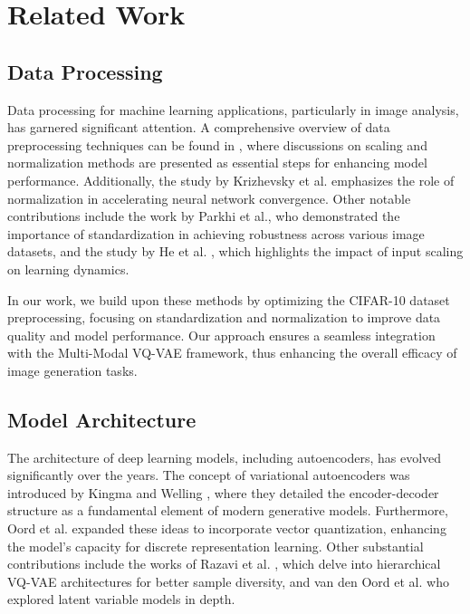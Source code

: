 \section{Related Work}

\subsection{Data Processing}

Data processing for machine learning applications, particularly in image analysis, has garnered significant attention. A comprehensive overview of data preprocessing techniques can be found in \cite{agarwal2019data}, where discussions on scaling and normalization methods are presented as essential steps for enhancing model performance. Additionally, the study by Krizhevsky et al. \cite{krizhevsky2012imagenet} emphasizes the role of normalization in accelerating neural network convergence. Other notable contributions include the work by Parkhi et al., who demonstrated the importance of standardization in achieving robustness across various image datasets, and the study by He et al. \cite{he2016deep}, which highlights the impact of input scaling on learning dynamics.

In our work, we build upon these methods by optimizing the CIFAR-10 dataset preprocessing, focusing on standardization and normalization to improve data quality and model performance. Our approach ensures a seamless integration with the Multi-Modal VQ-VAE framework, thus enhancing the overall efficacy of image generation tasks.

\subsection{Model Architecture}

The architecture of deep learning models, including autoencoders, has evolved significantly over the years. The concept of variational autoencoders was introduced by Kingma and Welling \cite{kingma2013auto}, where they detailed the encoder-decoder structure as a fundamental element of modern generative models. Furthermore, Oord et al. expanded these ideas to incorporate vector quantization, enhancing the model’s capacity for discrete representation learning. Other substantial contributions include the works of Razavi et al. \cite{razavi2019generating}, which delve into hierarchical VQ-VAE architectures for better sample diversity, and van den Oord et al. who explored latent variable models in depth.

